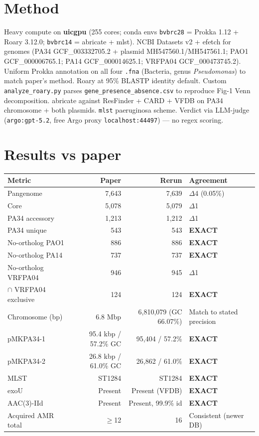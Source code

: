 \documentclass[11pt]{article}
\begin{document}
\section{Method}
Heavy compute on \textbf{uicgpu} (255 cores; conda envs \texttt{bvbrc28} = Prokka 1.12 +
Roary 3.12.0; \texttt{bvbrc14} = abricate + mlst). NCBI Datasets v2 + efetch for genomes
(PA34 GCF\_003332705.2 + plasmid MH547560.1/MH547561.1; PAO1 GCF\_000006765.1; PA14
GCF\_000014625.1; VRFPA04 GCF\_000473745.2). Uniform Prokka annotation on all four
\texttt{.fna} (Bacteria, genus \textit{Pseudomonas}) to match paper's method. Roary at 95\%
BLASTP identity default. Custom \texttt{analyze\_roary.py} parses
\texttt{gene\_presence\_absence.csv} to reproduce Fig-1 Venn decomposition. abricate against
ResFinder + CARD + VFDB on PA34 chromosome + both plasmids. \texttt{mlst} paeruginosa scheme.
Verdict via LLM-judge (\texttt{argo:gpt-5.2}, free Argo proxy \texttt{localhost:44497}) --- no
regex scoring.

\section{Results vs paper}
\begin{longtable}{lrrl}
\toprule
Metric & Paper & Rerun & Agreement \\
\midrule
Pangenome & 7{,}643 & 7{,}639 & $\Delta$4 (0.05\%) \\
Core & 5{,}078 & 5{,}079 & $\Delta$1 \\
PA34 accessory & 1{,}213 & 1{,}212 & $\Delta$1 \\
PA34 unique & 543 & 543 & \textbf{EXACT} \\
No-ortholog PAO1 & 886 & 886 & \textbf{EXACT} \\
No-ortholog PA14 & 737 & 737 & \textbf{EXACT} \\
No-ortholog VRFPA04 & 946 & 945 & $\Delta$1 \\
$\cap$ VRFPA04 exclusive & 124 & 124 & \textbf{EXACT} \\
Chromosome (bp) & 6.8 Mbp & 6{,}810{,}079 (GC 66.07\%) & Match to stated precision \\
pMKPA34-1 & 95.4 kbp / 57.2\% GC & 95{,}404 / 57.2\% & \textbf{EXACT} \\
pMKPA34-2 & 26.8 kbp / 61.0\% GC & 26{,}862 / 61.0\% & \textbf{EXACT} \\
MLST & ST1284 & ST1284 & \textbf{EXACT} \\
exoU & Present & Present (VFDB) & \textbf{EXACT} \\
AAC(3)-IId & Present & Present, 99.9\% id & \textbf{EXACT} \\
Acquired AMR total & $\geq$12 & 16 & Consistent (newer DB) \\
\bottomrule
\end{longtable}
\end{document}
